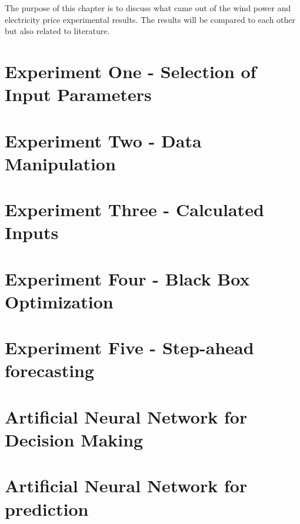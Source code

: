 The purpose of this chapter is to discuss what came out of the wind power and electricity price experimental results. The results will be compared to each other but also related to literature.

\section{Experiment One - Selection of Input Parameters}
\label{sec:inputParameterDiscussion}

\newpage

\section{Experiment Two - Data Manipulation}
\label{sec:matrixTrimmingDiscussion}


\newpage
\section{Experiment Three - Calculated Inputs}
\label{sec:calculatedInputDiscussion}


\newpage
\section{Experiment Four - Black Box Optimization}
\label{sec:blackBoxDiscussion}


\newpage
\section{Experiment Five - Step-ahead forecasting}
\label{sec:stepAheadForecastingDiscussion}


\newpage
\section{Artificial Neural Network for Decision Making}
\label{sec:annForDecisionMaking}


\newpage
\section{Artificial Neural Network for prediction}
\label{sec:annForPrediction}
